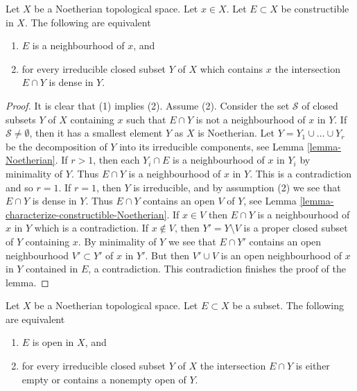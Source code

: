 \begin{lemma}
\label{lemma-constructible-neighbourhood-Noetherian}
Let $X$ be a Noetherian topological space.
Let $x \in X$.
Let $E \subset X$ be constructible in $X$.
The following are equivalent
\begin{enumerate}
\item $E$ is a neighbourhood of $x$, and
\item for every irreducible closed subset $Y$ of $X$ which contains
$x$ the intersection $E \cap Y$ is dense in $Y$.
\end{enumerate}
\end{lemma}

\begin{proof}
It is clear that (1) implies (2). Assume (2).
Consider the set $\mathcal{S}$ of closed subsets $Y$ of $X$ containing $x$
such that $E \cap Y$ is not a neighbourhood of $x$ in $Y$.
If $\mathcal{S} \not = \emptyset$, then it has a smallest element $Y$
as $X$ is Noetherian.
Let $Y = Y_1 \cup \ldots \cup Y_r$ be the decomposition of $Y$ into its
irreducible components, see
Lemma \ref{lemma-Noetherian}.
If $r > 1$, then each $Y_i \cap E$ is a neighbourhood of $x$ in $Y_i$
by minimality of $Y$. Thus $E \cap Y$ is a neighbourhood of $x$ in $Y$.
This is a contradiction and so $r = 1$. If $r = 1$, then $Y$ is
irreducible, and by assumption (2) we see that $E \cap Y$
is dense in $Y$. Thus $E \cap Y$ contains an open $V$ of $Y$, see
Lemma \ref{lemma-characterize-constructible-Noetherian}.
If $x \in V$ then $E \cap Y$ is a neighbourhood of $x$ in $Y$ which
is a contradiction. If $x \not \in V$, then $Y' = Y \setminus V$ is a
proper closed subset of $Y$ containing $x$. By minimality of $Y$
we see that $E \cap Y'$ contains an open neighbourhood $V' \subset Y'$
of $x$ in $Y'$. But then $V' \cup V$ is an open neighbourhood of $x$
in $Y$ contained in $E$, a contradiction.
This contradiction finishes the proof of the lemma.
\end{proof}

\begin{lemma}
\label{lemma-characterize-open-Noetherian}
Let $X$ be a Noetherian topological space.
Let $E \subset X$ be a subset.
The following are equivalent
\begin{enumerate}
\item $E$ is open in $X$, and
\item for every irreducible closed subset $Y$ of $X$
the intersection $E \cap Y$ is either empty or
contains a nonempty open of $Y$.
\end{enumerate}
\end{lemma}

